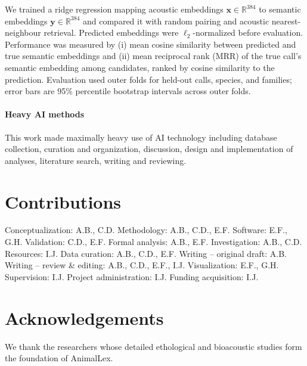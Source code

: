 \documentclass[external]{esp-paper}
\newcommand{\dbname}{AnimalLex\xspace}
\begin{document}
We trained a ridge regression mapping acoustic embeddings $\mathbf{x} \in \mathbb{R}^{384}$ to semantic embeddings $\mathbf{y} \in \mathbb{R}^{384}$ and compared it with random pairing and acoustic nearest-neighbour retrieval. Predicted embeddings were $\ell_2$-normalized before evaluation. Performance was measured by (i) mean cosine similarity between predicted and true semantic embeddings and (ii) mean reciprocal rank (MRR) of the true call's semantic embedding among candidates, ranked by cosine similarity to the prediction. Evaluation used \nfolds outer folds for held-out calls, species, and families; error bars are 95\% percentile bootstrap intervals across outer folds.

\paragraph{Heavy AI methods}

This work made maximally heavy use of AI technology including database collection, curation and organization, discussion, design and implementation of analyses, literature search, writing and reviewing.


\section{Contributions}
{\small{}
{\headingfont Conceptualization:} A.B., C.D.
{\headingfont Methodology:} A.B., C.D., E.F.
{\headingfont Software:} E.F., G.H.
{\headingfont Validation:} C.D., E.F.
{\headingfont Formal analysis:} A.B., E.F.
{\headingfont Investigation:} A.B., C.D.
{\headingfont Resources:} I.J.
{\headingfont Data curation:} A.B., C.D., E.F.
{\headingfont Writing -- original draft:} A.B.
{\headingfont Writing -- review \& editing:} A.B., C.D., E.F., I.J.
{\headingfont Visualization:} E.F., G.H.
{\headingfont Supervision:} I.J.
{\headingfont Project administration:} I.J.
{\headingfont Funding acquisition:} I.J.}

\section{Acknowledgements}
We thank the researchers whose detailed ethological and bioacoustic studies form the foundation of \dbname.

\printbibliography
\end{document}

